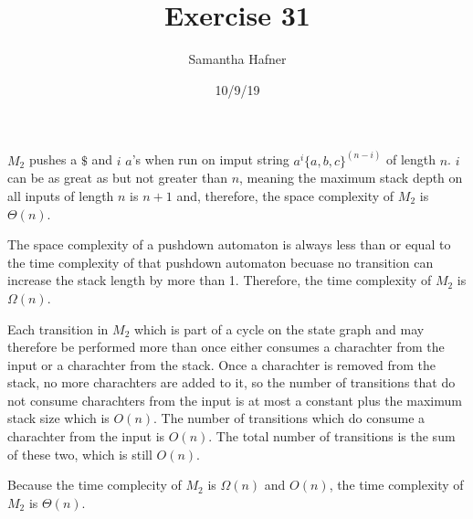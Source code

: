 \documentclass[12pt]{article}
\title{Exercise 31}
\author{Samantha Hafner}
\date{10/9/19}
\begin{document}
\maketitle

$M_2$ pushes a $\$$ and $i$ $a$'s when run on imput string $a^i\{a,b,c\}^{(n-i)}$ of length $n$. $i$ can be as great as but not greater than $n$, meaning the maximum stack depth on all inputs of length $n$ is $n+1$ and, therefore, the space complexity of $M_2$ is $\Theta(n)$.

The space complexity of a pushdown automaton is always less than or equal to the time complexity of that pushdown automaton becuase no transition can increase the stack length by more than 1. Therefore, the time complexity of $M_2$ is $\Omega(n)$.

Each transition in $M_2$ which is part of a cycle on the state graph and may therefore be performed more than once either consumes a charachter from the input or a charachter from the stack. Once a charachter is removed from the stack, no more charachters are added to it, so the number of transitions that do not consume charachters from the input is at most a constant plus the maximum stack size which is $O(n)$. The number of transitions which do consume a charachter from the input is $O(n)$. The total number of transitions is the sum of these two, which is still $O(n)$.

Because the time complecity of $M_2$ is $\Omega(n)$ and $O(n)$, the time complexity of $M_2$ is $\Theta(n)$.
\end{document}
